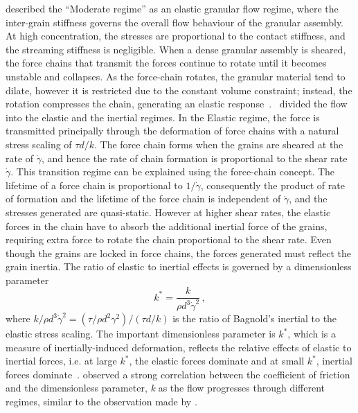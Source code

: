 \citet{Campbell2002} described the ``Moderate regime'' as an elastic granular 
flow regime, where the inter-grain stiffness governs the overall flow 
behaviour of the granular assembly. At high concentration, the stresses are 
proportional to the contact stiffness, and the streaming stiffness is 
negligible. When a dense granular assembly is sheared, the force chains that 
transmit the forces continue to rotate until it becomes unstable and collapses. 
As the force-chain rotates, the granular material tend to dilate, however it is 
restricted due to the constant volume constraint; instead, the rotation 
compresses the chain, generating an elastic 
response~\citep{Campbell2006}.~\citet{Campbell2002} divided the flow into the 
elastic and the inertial regimes. In the Elastic regime, the force is 
transmitted principally through the deformation of force chains with a natural 
stress scaling of $\tau \textit{d}/\textit{k}$. The force chain forms when the 
grains are sheared at the rate of $\dot{\gamma}$, and hence the rate of 
chain formation is proportional to the shear rate $\dot{\gamma}$. This 
transition regime can be explained using the force-chain concept. The lifetime 
of a force chain is proportional to $1/\dot{\gamma}$, consequently the product 
of rate of formation and the lifetime of the force chain is independent of 
$\dot{\gamma}$, and the stresses generated are quasi-static. However at higher 
shear rates, the elastic forces in the chain have to absorb the additional 
inertial force of the grains, requiring extra force to rotate the chain 
proportional to the shear rate. Even though the grains are locked in force 
chains, the forces generated must reflect the grain inertia. The ratio of 
elastic to inertial effects is governed by a dimensionless parameter
%
\begin{equation}
\textit{k}^{*} = \frac{k}{\rho \textit{d}^{3} \dot{\gamma}^{2}} \,,
\end{equation}
%
where ${k}/{\rho \textit{d}^{3} \dot{\gamma}^{2}}=({\tau}/{\rho \textit{d}^{2} 
{\gamma}^{2}})/(\tau\textit{d}/\textit{k})$ is the ratio of Bagnold's inertial 
to the elastic stress scaling. The important dimensionless parameter is 
$\textit{k}^{*}$, which is a measure of inertially-induced deformation, 
reflects the relative effects of elastic to inertial forces, i.e. at large 
$\textit{k}^{*}$, the elastic forces dominate and at small $\textit{k}^{*}$, 
inertial forces dominate~\citep{Campbell2006}. \citet{Campbell2002} observed a 
strong correlation between the coefficient of friction and the dimensionless 
parameter, \textit{k} as the flow progresses through different regimes, similar 
to the observation made by \citet{Kamrin2010}. 

